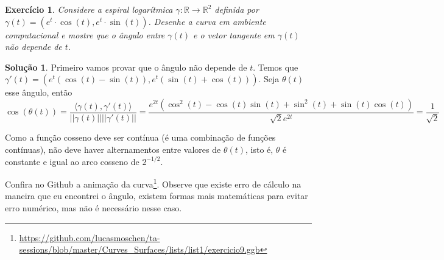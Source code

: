 \documentclass[a4paper,12pt]{article}
\newcommand{\R}{\mathbb{R}}
\theoremstyle{exer}
\newtheorem{exercise}{Exercício}
\theoremstyle{definition}
\newtheorem{solution}{Solução}
\theoremstyle{plain}
\begin{document}
\begin{exercise}
    Considere a espiral logarítmica $\gamma : \R \to \R^2$ definida por
    $\gamma(t) = (e^t\cdot\cos(t), e^t\cdot\sin(t))$. Desenhe a curva em
    ambiente computacional e mostre que o ângulo entre $\gamma(t)$ e o vetor tangente em $\gamma(t)$ não depende de $t$.
\end{exercise}

\begin{solution}
    Primeiro vamos provar que o ângulo não depende de $t$. Temos que $\gamma
    '(t) = (e^t(\cos(t) - \sin(t)), e^t(\sin(t) + \cos(t)))$. Seja $\theta(t)$
    esse ângulo, então
    $$
    \cos(\theta(t)) = \frac{\langle \gamma(t), \gamma '(t) \rangle}{||\gamma(t)||||\gamma '(t)||} = \frac{e^{2t}(\cos^2(t) - \cos(t)\sin(t) + \sin^2(t) + \sin(t)\cos(t))}{\sqrt{2}e^{2t}} = \frac{1}{\sqrt{2}}
    $$

    Como a função cosseno deve ser contínua (é uma combinação de funções
    contínuas), não deve haver alternamentos entre valores de $\theta(t)$,
    isto é, $\theta$ é constante e igual ao arco cosseno de $2^{-1/2}$.

    Confira no Github a animação da
    curva\footnote{\url{https://github.com/lucasmoschen/ta-sessions/blob/master/Curves_Surfaces/lists/list1/exercicio9.ggb}}.
    Observe que existe erro de cálculo na maneira que eu encontrei o ângulo,
    existem formas mais matemáticas para evitar erro numérico, mas não é
    necessário nesse caso. 

\end{solution}
\end{document}
